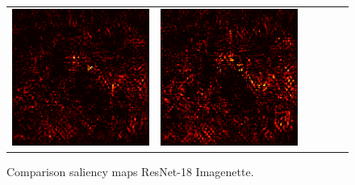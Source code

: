 \documentclass[preprint,12pt]{elsarticle}
\begin{document}
\begin{figure}[ht]
\begin{tabular}{cccccc}
  \includegraphics[scale=\scale]{../visualizations/examples/imagenette/resnet18/active_saliency_map/2.png} & 
  \includegraphics[scale=\scale]{../visualizations/examples/imagenette/resnet18/inactive_saliency_map/2.png} \\
  \end{tabular}
  \caption{Comparison saliency maps ResNet-18 Imagenette.}
  \label{fig: comparison saliency maps resnet18 imagenette}
\end{figure}
\end{document}
